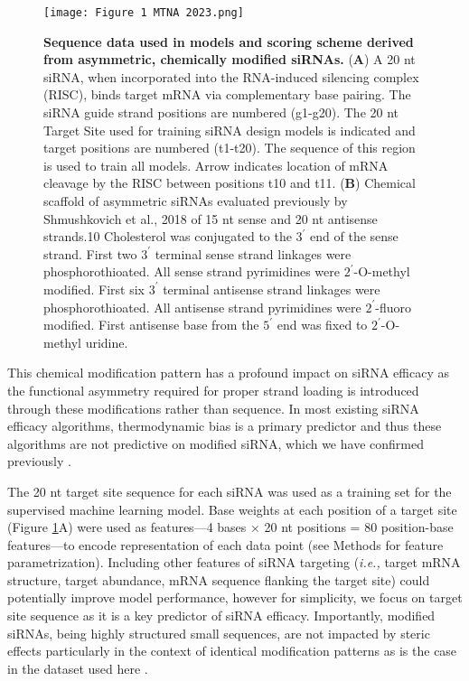 \documentclass{report}
\begin{document}
\begin{figure}
    \centering
    \texttt{[image: Figure 1 MTNA 2023.png]}
    \caption{\textbf{Sequence data used in models and scoring scheme derived from asymmetric, chemically modified siRNAs. }(\textbf{A}) A 20 nt siRNA, when incorporated into the RNA-induced silencing complex (RISC), binds target mRNA via complementary base pairing. The siRNA guide strand positions are numbered (g1-g20). The 20 nt Target Site used for training siRNA design models is indicated and target positions are numbered (t1-t20). The sequence of this region is used to train all models. Arrow indicates location of mRNA cleavage by the RISC between positions t10 and t11. (\textbf{B}) Chemical scaffold of asymmetric siRNAs evaluated previously by Shmushkovich et al., 2018 \cite{shmushkovich_functional_2018} of 15 nt sense and 20 nt antisense strands.10 Cholesterol was conjugated to the $3^\prime$ end of the sense strand. First two $3^\prime$ terminal sense strand linkages were phosphorothioated. All sense strand pyrimidines were $2^\prime$-O-methyl modified. First six $3^\prime$ terminal antisense strand linkages were phosphorothioated. All antisense strand pyrimidines were $2^\prime$-fluoro modified. First antisense base from the $5^\prime$ end was fixed to $2^\prime$-O-methyl uridine.
}
    \label{fig:Figure* 1}
\end{figure}

 This chemical modification pattern has a profound impact on siRNA efficacy as the functional asymmetry required for proper strand loading is introduced through these modifications rather than sequence. In most existing siRNA efficacy algorithms, thermodynamic bias is a primary predictor and thus these algorithms are not predictive on modified siRNA, \cite{reynolds_rational_2004,ichihara_thermodynamic_2007,lu_efficient_2008,shabalina_computational_2006} which we have confirmed previously \cite{hassler_comparison_2018}.

 The 20 nt target site sequence for each siRNA was used as a training set for the supervised machine learning model. Base weights at each position of a target site (Figure \ref{fig:Figure* 1}A) were used as features—4 bases × 20 nt positions = 80 position-base features—to encode representation of each data point (see Methods for feature parametrization). Including other features of siRNA targeting (\textit{i.e.,} target mRNA structure, target abundance, mRNA sequence flanking the target site) could potentially improve model performance, however for simplicity, we focus on target site sequence as it is a key predictor of siRNA efficacy. Importantly, modified siRNAs, being highly structured small sequences, are not impacted by steric effects particularly in the context of identical modification patterns as is the case in the dataset used here \cite{iribe_chemical_2017,somoza_steric_2008}.
\end{document}

